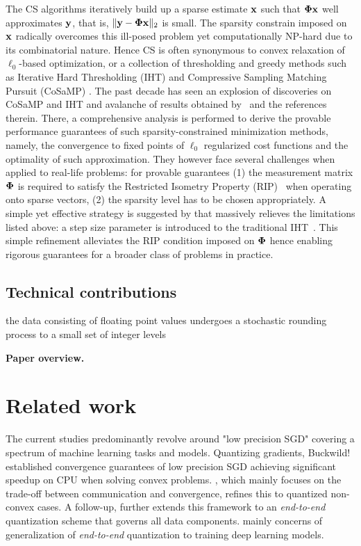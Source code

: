 \documentclass{article}
\begin{document}
The CS algorithms iteratively build up a sparse estimate ${\bf x}$ such that ${\bf \Phi}  {\bf x}$ well approximates ${\bf y}$, that is,  $\| {\bf y}- {\bf \Phi}  {\bf x} \|_2$ is small. The sparsity constrain imposed on ${\bf x}$ radically overcomes this ill-posed problem yet computationally NP-hard due to its combinatorial nature. Hence CS is often synonymous to convex relaxation of $\ell_0$-based optimization, or a collection of thresholding and greedy methods such as Iterative Hard Thresholding (IHT) \cite{blumensath2008iht, blumensath2009iht} and Compressive Sampling Matching Pursuit (CoSaMP) \cite{needel2008cosamp}. The past decade has seen an explosion of discoveries on CoSaMP and IHT and avalanche of results obtained by~\cite{liu2017dualiht, yuan2014ht, yuan2016htp, blumensath2013cs, needel2008cosamp} and the references therein. There, a comprehensive analysis is performed to derive the provable performance guarantees of such sparsity-constrained minimization methods, namely, the convergence to fixed points of $\ell_0$ regularized cost functions and the optimality of such approximation. They however face several challenges when applied to real-life problems: for provable guarantees (1) the measurement matrix ${\bf \Phi}$ is required to satisfy the Restricted Isometry Property (RIP)~\cite{candes2008rip, chartrand2008rip} when operating onto sparse vectors, (2) the sparsity level has to be chosen appropriately. A simple yet effective strategy is suggested by \cite{blumensath2010niht} that massively relieves the limitations listed above: a step size parameter is introduced to the traditional IHT~\cite{blumensath2008iht}. This simple refinement alleviates the RIP condition imposed on ${\bf \Phi}$ hence enabling rigorous guarantees for a broader class of problems in practice. 
\subsection{Technical contributions}
 the data consisting of floating point values undergoes a stochastic rounding process to a small set of integer levels
 
{\bf Paper overview. }
\section{Related work}
The current studies predominantly revolve around "low precision SGD" covering a spectrum of machine learning tasks and models. Quantizing gradients, Buckwild!~\cite{desa2015hogwild} established convergence guarantees of low precision SGD achieving significant speedup on CPU when solving convex problems. \cite{alistarh2016qsgd}, which mainly focuses on the trade-off between communication and convergence, refines this to quantized non-convex cases. A follow-up, \cite{zhang2017zipml} further extends this framework to an {\it end-to-end} quantization scheme that governs all data components. \cite{seide2014sgd1bit, hubara2016qsnn, rastegari2016binarycnn,zhou2016cnn, miyashita2016cnn, li2016twn, gupta2015dl} mainly concerns of generalization of {\it end-to-end} quantization to training deep learning models. 
\end{document}
